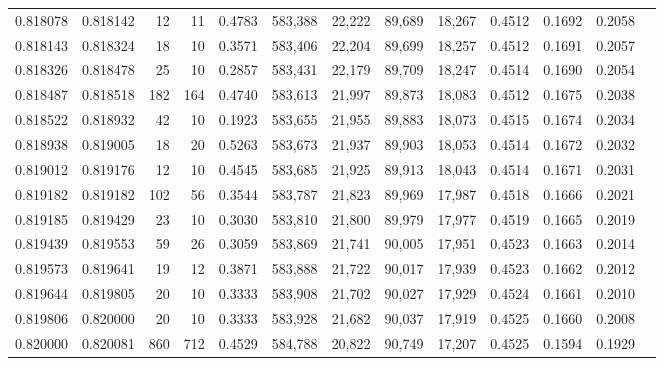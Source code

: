 \begin{tabular}{rrrrrrrrrrrrr}
0.818078 & 0.818142 &    12 &  11 &                                     0.4783 & 583,388 &  22,222 &  89,689 &  18,267 & 0.4512 & 0.1692 & 0.2058 \\
0.818143 & 0.818324 &    18 &  10 &                                     0.3571 & 583,406 &  22,204 &  89,699 &  18,257 & 0.4512 & 0.1691 & 0.2057 \\
0.818326 & 0.818478 &    25 &  10 &                                     0.2857 & 583,431 &  22,179 &  89,709 &  18,247 & 0.4514 & 0.1690 & 0.2054 \\
0.818487 & 0.818518 &   182 & 164 &                                     0.4740 & 583,613 &  21,997 &  89,873 &  18,083 & 0.4512 & 0.1675 & 0.2038 \\
0.818522 & 0.818932 &    42 &  10 &                                     0.1923 & 583,655 &  21,955 &  89,883 &  18,073 & 0.4515 & 0.1674 & 0.2034 \\
0.818938 & 0.819005 &    18 &  20 &                                     0.5263 & 583,673 &  21,937 &  89,903 &  18,053 & 0.4514 & 0.1672 & 0.2032 \\
0.819012 & 0.819176 &    12 &  10 &                                     0.4545 & 583,685 &  21,925 &  89,913 &  18,043 & 0.4514 & 0.1671 & 0.2031 \\
0.819182 & 0.819182 &   102 &  56 &                                     0.3544 & 583,787 &  21,823 &  89,969 &  17,987 & 0.4518 & 0.1666 & 0.2021 \\
0.819185 & 0.819429 &    23 &  10 &                                     0.3030 & 583,810 &  21,800 &  89,979 &  17,977 & 0.4519 & 0.1665 & 0.2019 \\
0.819439 & 0.819553 &    59 &  26 &                                     0.3059 & 583,869 &  21,741 &  90,005 &  17,951 & 0.4523 & 0.1663 & 0.2014 \\
0.819573 & 0.819641 &    19 &  12 &                                     0.3871 & 583,888 &  21,722 &  90,017 &  17,939 & 0.4523 & 0.1662 & 0.2012 \\
0.819644 & 0.819805 &    20 &  10 &                                     0.3333 & 583,908 &  21,702 &  90,027 &  17,929 & 0.4524 & 0.1661 & 0.2010 \\
0.819806 & 0.820000 &    20 &  10 &                                     0.3333 & 583,928 &  21,682 &  90,037 &  17,919 & 0.4525 & 0.1660 & 0.2008 \\
0.820000 & 0.820081 &   860 & 712 &                                     0.4529 & 584,788 &  20,822 &  90,749 &  17,207 & 0.4525 & 0.1594 & 0.1929 \\

\end{tabular}
